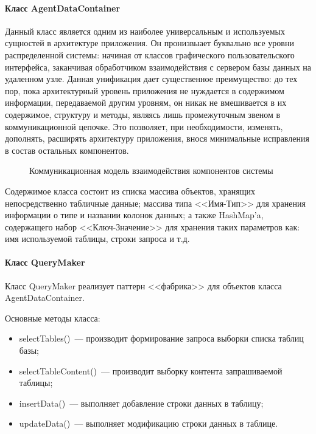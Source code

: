 \paragraph{Класс AgentDataContainer}
Данный класс является одним из наиболее универсальным и используемых сущностей в архитектуре приложения. Он пронизвыает буквально все уровни распределенной системы: начиная от классов графического пользовательского интерфейса, заканчивая обработчиком взаимодействия с сервером базы данных на удаленном узле. Данная унификация дает существенное преимущество: до тех пор, пока архитектурный уровень приложения не нуждается в содержимом информации, передаваемой другим уровням, он никак не вмешивается в их содержимое, структуру и методы, являясь лишь промежуточным звеном в коммуникационной цепочке. Это позволяет, при необходимости, изменять, дополнять, расширять архитектуру приложения, внося минимальные исправления в состав остальных компонентов.
\begin{figure}[h]
\caption{Коммуникационная модель взаимодействия компонентов системы}
\label{3:comm-dia}
\end{figure}

Содержимое класса состоит из списка массива объектов, хранящих непосредственно табличные данные; массива типа <<Имя-Тип>> для хранения информации о типе и названии колонок данных; а также HashMap'a, содержащего набор <<Ключ-Значение>> для хранения таких параметров как: имя используемой таблицы, строки запроса и т.д.

\paragraph{Класс QueryMaker}
Класс QueryMaker реализует паттерн <<фабрика>> для объектов класса AgentDataContainer.

Основные методы класса:
\begin{itemize}
\item selectTables()~--- производит формирование запроса выборки списка таблиц базы;
\item selectTableContent()~--- производит выборку контента запрашиваемой таблицы;
\item insertData()~--- выполняет добавление строки данных в таблицу;
\item updateData()~--- выполняет модификацию строки данных в таблице.
\end{itemize}

